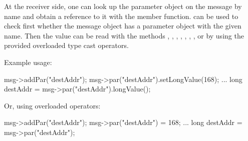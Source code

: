 At the receiver side, one can look up the parameter object on the message
by name and obtain a reference to it with the  member function.
 can be used to check first whether the message object has a parameter
object with the given name. Then the value can be read with the methods
, , ,
, , ,
, or by using the provided overloaded type cast operators.

Example usage:

\begin{cpp}
msg->addPar("destAddr");
msg->par("destAddr").setLongValue(168);
...
long destAddr = msg->par("destAddr").longValue();
\end{cpp}

Or, using overloaded operators:

\begin{cpp}
msg->addPar("destAddr");
msg->par("destAddr") = 168;
...
long destAddr = msg->par("destAddr");
\end{cpp}

